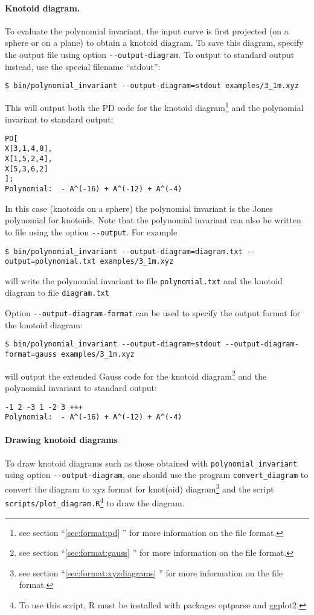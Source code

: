 \paragraph{Knotoid diagram.}
To evaluate the polynomial invariant, the input curve is first projected (on a sphere or on a plane) to obtain a knotoid diagram. To save this diagram, specify the output file using option \lstinline{--output-diagram}. To output to standard output instead, use the special filename ``stdout'': 
\begin{lstlisting}
$ bin/polynomial_invariant --output-diagram=stdout examples/3_1m.xyz
\end{lstlisting}
This will output both the PD code for the knotoid diagram\footnote{see section ``\ref{sec:format:pd} '' for more information on the file format.} and the polynomial invariant to standard output:
\begin{lstlisting}
PD[
X[3,1,4,0],
X[1,5,2,4],
X[5,3,6,2]
];
Polynomial:  - A^(-16) + A^(-12) + A^(-4)
\end{lstlisting}
In this case (knotoids on a sphere) the polynomial invariant is the Jones polynomial for knotoids.
Note that the polynomial invariant can also be written to file using the option \lstinline{--output}. For example
\begin{lstlisting}
$ bin/polynomial_invariant --output-diagram=diagram.txt --output=polynomial.txt examples/3_1m.xyz
\end{lstlisting}
will write the polynomial invariant to file \lstinline{polynomial.txt} and the knotoid diagram to file \lstinline{diagram.txt}

Option \lstinline{--output-diagram-format} can be used to specify the output format for the knotoid diagram:
\begin{lstlisting}
$ bin/polynomial_invariant --output-diagram=stdout --output-diagram-format=gauss examples/3_1m.xyz
\end{lstlisting}
will output the extended Gauss code for the knotoid diagram\footnote{see section ``\ref{sec:format:gauss} '' for more information on the file format.} and the polynomial invariant to standard output:
\begin{lstlisting}
-1 2 -3 1 -2 3 +++
Polynomial:  - A^(-16) + A^(-12) + A^(-4)
\end{lstlisting}

\paragraph{Drawing knotoid diagrams}
To draw knotoid diagrams such as those obtained with \lstinline{polynomial_invariant} using option \lstinline{--output-diagram}, one should use the program \lstinline{convert_diagram} to convert the diagram to xyz format for knot(oid) diagram\footnote{see section ``\ref{sec:format:xyzdiagrams} '' for more information on the file format.} and the script \lstinline{scripts/plot_diagram.R}\footnote{To use this script, {\ttfamily R}\cite{r2017} must be installed with packages {\ttfamily optparse}\cite{optparse} and {\ttfamily ggplot2}\cite{wickham2009}.} to draw the diagram.

